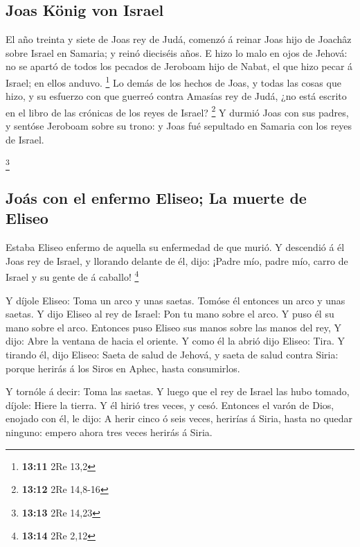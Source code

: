 \hypertarget{joas-kuxf6nig-von-israel}{%
\subsection{Joas König von Israel}\label{joas-kuxf6nig-von-israel}}

 El año treinta y siete de Joas rey de Judá, comenzó á
reinar Joas hijo de Joachâz sobre Israel en Samaria; y reinó dieciséis
años.  E hizo lo malo en ojos de Jehová: no se apartó de
todos los pecados de Jeroboam hijo de Nabat, el que hizo pecar á Israel;
en ellos anduvo. \footnote{\textbf{13:11} 2Re 13,2}  Lo
demás de los hechos de Joas, y todas las cosas que hizo, y su esfuerzo
con que guerreó contra Amasías rey de Judá, ¿no está escrito en el libro
de las crónicas de los reyes de Israel? \footnote{\textbf{13:12} 2Re
  14,8-16}  Y durmió Joas con sus padres, y sentóse
Jeroboam sobre su trono: y Joas fué sepultado en Samaria con los reyes
de Israel.

\footnote{\textbf{13:13} 2Re 14,23}

\hypertarget{jouxe1s-con-el-enfermo-eliseo-la-muerte-de-eliseo}{%
\subsection{Joás con el enfermo Eliseo; La muerte de
Eliseo}\label{jouxe1s-con-el-enfermo-eliseo-la-muerte-de-eliseo}}

 Estaba Eliseo enfermo de aquella su enfermedad de que
murió. Y descendió á él Joas rey de Israel, y llorando delante de él,
dijo: ¡Padre mío, padre mío, carro de Israel y su gente de á caballo!
\footnote{\textbf{13:14} 2Re 2,12}

 Y díjole Eliseo: Toma un arco y unas saetas. Tomóse él
entonces un arco y unas saetas.  Y dijo Eliseo al rey de
Israel: Pon tu mano sobre el arco. Y puso él su mano sobre el arco.
Entonces puso Eliseo sus manos sobre las manos del rey,  Y
dijo: Abre la ventana de hacia el oriente. Y como él la abrió dijo
Eliseo: Tira. Y tirando él, dijo Eliseo: Saeta de salud de Jehová, y
saeta de salud contra Siria: porque herirás á los Siros en Aphec, hasta
consumirlos.

 Y tornóle á decir: Toma las saetas. Y luego que el rey de
Israel las hubo tomado, díjole: Hiere la tierra. Y él hirió tres veces,
y cesó.  Entonces el varón de Dios, enojado con él, le
dijo: A herir cinco ó seis veces, herirías á Siria, hasta no quedar
ninguno: empero ahora tres veces herirás á Siria.

